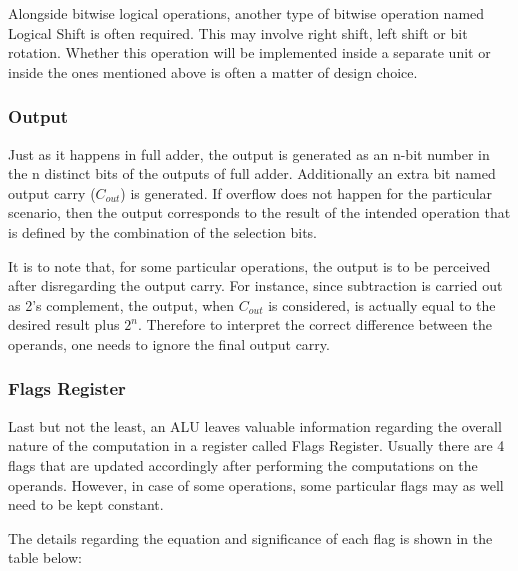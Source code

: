 \documentclass{article}
\begin{document}
Alongside bitwise logical operations, another type of bitwise operation named Logical Shift is often required. This may involve right shift, left shift or bit rotation. Whether this operation will be implemented inside a separate unit or inside the ones mentioned above is often a matter of design choice.

\subsubsection{Output}

Just as it happens in full adder, the output is generated as an n-bit number in the n distinct bits of the outputs of full adder. Additionally an extra bit named output carry ($C_{out}$) is generated. If overflow does not happen for the particular scenario, then the output corresponds to the result of the intended operation that is defined by the combination of the selection bits.

It is to note that, for some particular operations, the output is to be perceived after disregarding the output carry. For instance, since subtraction is carried out as 2’s complement, the output, when $C_{out}$ is considered, is actually equal to the desired result plus $2^n$. Therefore to interpret the correct difference between the operands, one needs to ignore the final output carry.

\subsubsection{Flags Register}

Last but not the least, an ALU leaves valuable information regarding the overall nature of the computation in a register called Flags Register. Usually there are 4 flags that are updated accordingly after performing the computations on the operands. However, in case of some operations, some particular flags may as well need to be kept constant.

The details regarding the equation and significance of each flag is shown in the table below:
\end{document}
